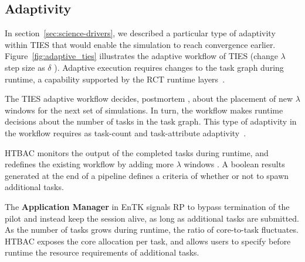 \subsection{Adaptivity}

In section~\ref{sec:science-drivers}, we described a particular type of
adaptivity within TIES that would enable the simulation  to reach convergence
earlier. Figure~\ref{fig:adaptive_ties} illustrates the adaptive workflow of
TIES (change $\lambda$ step size as $\delta$ ). Adaptive execution requires
changes to the task graph during runtime, a capability supported by the RCT
runtime layers~\cite{power-of-many17}.

The TIES adaptive workflow decides, postmortem , about the
placement of new $\lambda$ windows for the next set of simulations. In turn,
the workflow makes runtime decisions about the number of tasks in the task
graph. This type of adaptivity in the workflow requires as  task-count and task-attribute
adaptivity~\cite{adaptivebiomolecular}.

HTBAC monitors the output of the completed tasks during runtime, and
redefines the existing workflow by adding more $\lambda$ windows . A boolean results generated
at the end of a pipeline defines a criteria of whether or not
 to spawn additional
tasks.


The \textbf{Application Manager} in EnTK signals RP to bypass termination of
the pilot and instead keep the session alive, as long as additional tasks are
submitted. As the number of tasks grows during runtime, the ratio of
core-to-task fluctuates. HTBAC exposes the core allocation per task, and
allows users to specify before runtime the resource requirements of
additional tasks.

